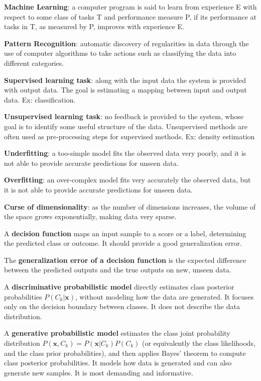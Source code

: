\setlength{\parindent}{0pt}  %
\setlength{\parskip}{0.7em}  %


\textbf{Machine Learning}: a computer program is said to learn from experience E with respect to some class of tasks T and performance measure P, if its performance at tasks in T, as measured by P, improves with experience E.

\textbf{Pattern Recognition}: automatic discovery of regularities in data through the use of computer algorithms to take actions such as classifying the data into different categories.

\textbf{Supervised learning task}: along with the input data the system is provided with output data. The goal is estimating a mapping between input and output data.
Ex: classification.

\textbf{Unsupervised learning task}: no feedback is provided to the system, whose goal is to identify some useful structure of the data.
Unsupervised methods are often used as pre-processing steps for supervised methods.
Ex: density estimation

\textbf{Underfitting}: a too-simple model fits the observed data very poorly, and it is not able to provide accurate predictions for unseen data.

\textbf{Overfitting}: an over-complex model fits very accurately the observed data, but it is not able to provide accurate predictions for unseen data.

\textbf{Curse of dimensionality}: as the number of dimensions increases, the volume of the space grows exponentially, making data very sparse.

A \textbf{decision function} maps an input sample to a score or a label, determining the predicted class or outcome. It should provide a good generalization error.

The \textbf{generalization error of a decision function} is the expected difference between the predicted outputs and the true outputs on new, unseen data.

A \textbf{discriminative probabilistic model} directly estimates class posterior probabilities $P(C_k|\mathbf{x})$, without modeling how the data are generated. It focuses only on the decision boundary between classes. It does not describe the data distribution.

A \textbf{generative probabilistic model} estimates the class joint probability distribution $P(\mathbf{x}, C_k) = P(\mathbf{x}|C_k)P(C_k)$ (or equivalently the class likelihoods, and the class prior probabilities), and then applies Bayes' theorem to compute class posterior probabilities. It models how data is generated and can also generate new samples. It is most demanding and informative.

